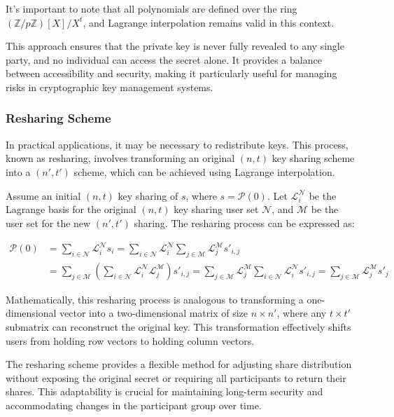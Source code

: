 \documentclass[11pt]{article}
\begin{document}
It's important to note that all polynomials are defined over the ring $(\mathbb{Z}/p\mathbb{Z})[X]/X^{t}$, and Lagrange interpolation remains valid in this context.

This approach ensures that the private key is never fully revealed to any single party, and no individual can access the secret alone. It provides a balance between accessibility and security, making it particularly useful for managing risks in cryptographic key management systems.

\subsubsection{Resharing Scheme}
\label{sec:resharing}

In practical applications, it may be necessary to redistribute keys. This process, known as resharing\cite{groth2021non}, involves transforming an original $(n,t)$ key sharing scheme into a $(n',t')$ scheme, which can be achieved using Lagrange interpolation.

Assume an initial $(n,t)$ key sharing of $s$, where $s=\mathcal{P}(0)$. Let $\mathcal{L}^\mathcal{N}_i$ be the Lagrange basis for the original $(n,t)$ key sharing user set $\mathcal{N}$, and $\mathcal{M}$ be the user set for the new $(n',t')$ sharing. The resharing process can be expressed as:

\begin{equation}
\begin{aligned}
\mathcal{P}(0)&=\sum_{i\in\mathcal{N}}\mathcal{L}^\mathcal{N}_is_i=\sum_{i\in\mathcal{N}}\mathcal{L}^\mathcal{N}_i\sum_{j\in\mathcal{M}}\mathcal{L}^\mathcal{M}_js'_{i,j}\\
&=\sum_{j\in\mathcal{M}}\left(\sum_{i\in\mathcal{N}}\mathcal{L}^\mathcal{N}_i\mathcal{L}^\mathcal{M}_j\right)s'_{i,j}
=\sum_{j\in\mathcal{M}}\mathcal{L}^\mathcal{M}_j\sum_{i\in\mathcal{N}}\mathcal{L}^\mathcal{N}_is'_{i,j}=\sum_{j\in\mathcal{M}}\mathcal{L}^\mathcal{M}_js'_j
\end{aligned}
\end{equation}

Mathematically, this resharing process is analogous to transforming a one-dimensional vector into a two-dimensional matrix of size $n \times n'$, where any $t \times t'$ submatrix can reconstruct the original key. This transformation effectively shifts users from holding row vectors to holding column vectors.

The resharing scheme provides a flexible method for adjusting share distribution without exposing the original secret or requiring all participants to return their shares. This adaptability is crucial for maintaining long-term security and accommodating changes in the participant group over time.
\end{document}
